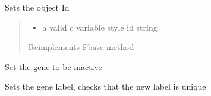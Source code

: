 \documentclass[letterpaper,10pt,english]{sphinxmanual}
\begin{document}
\begin{fulllineitems}
\begin{fulllineitems}
\end{fulllineitems}


\begin{fulllineitems}
\label{\detokenize{modules_doc:cbmpy.CBModel.Gene.setId}}
\pysigstartsignatures
{}
\pysigstopsignatures
\sphinxAtStartPar
Sets the object Id
\begin{quote}
\begin{itemize}
\item {} 
\sphinxAtStartPar
{} a valid c variable style id string

\end{itemize}

\sphinxAtStartPar
Reimplements Fbase method
\end{quote}

\end{fulllineitems}


\begin{fulllineitems}
\label{\detokenize{modules_doc:cbmpy.CBModel.Gene.setInactive}}
\pysigstartsignatures
{}
\pysigstopsignatures
\sphinxAtStartPar
Set the gene to be inactive

\end{fulllineitems}


\begin{fulllineitems}
\label{\detokenize{modules_doc:cbmpy.CBModel.Gene.setLabel}}
\pysigstartsignatures
{}
\pysigstopsignatures
\sphinxAtStartPar
Sets the gene label, checks that the new label is unique

\end{fulllineitems}


\end{fulllineitems}

\end{document}
